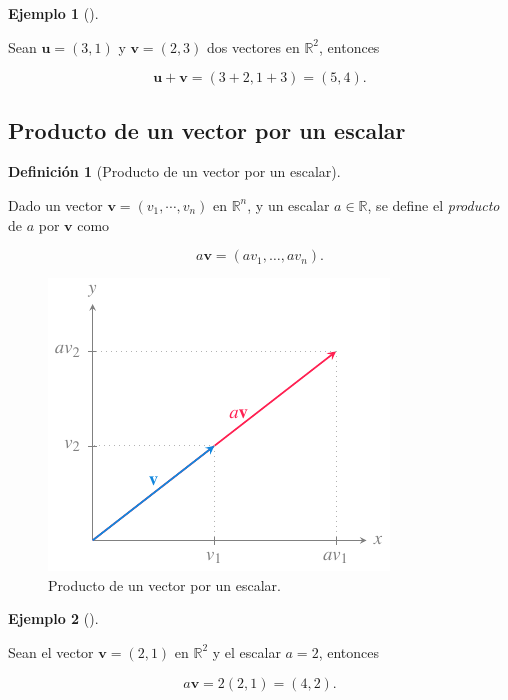 \documentclass[
  a4paper,
]{scrreport}
\theoremstyle{definition}
\newtheorem{example}{Ejemplo}[chapter]
\theoremstyle{plain}
\theoremstyle{definition}
\newtheorem{definition}{Definición}[chapter]
\theoremstyle{definition}
\theoremstyle{plain}
\theoremstyle{plain}
\theoremstyle{remark}
\begin{document}
\begin{example}[]\protect\hypertarget{exm-suma-vectores}{}\label{exm-suma-vectores}

Sean \(\mathbf{u}=(3,1)\) y \(\mathbf{v}=(2,3)\) dos vectores en
\(\mathbb{R}^2\), entonces

\[
\mathbf{u}+\mathbf{v} = (3+2,1+3) = (5,4).
\]

\end{example}

\subsection{Producto de un vector por un
escalar}\label{producto-de-un-vector-por-un-escalar}

\begin{definition}[Producto de un vector por un
escalar]\protect\hypertarget{def-producto-por-escalar}{}\label{def-producto-por-escalar}

Dado un vector \(\mathbf{v}=(v_1,\cdots,v_n)\) en \(\mathbb{R}^n\), y un
escalar \(a\in \mathbb{R}\), se define el \emph{producto} de \(a\) por
\(\mathbf{v}\) como

\[
a\mathbf{v} = (av_1,\ldots, av_n).
\]

\end{definition}

\begin{figure}[H]

{\centering \includegraphics{img/geometria-plano-espacio/producto-vector-por-escalar.pdf}

}

\caption{Producto de un vector por un escalar.}

\end{figure}%

\begin{example}[]\protect\hypertarget{exm-producto-por-escalar}{}\label{exm-producto-por-escalar}

Sean el vector \(\mathbf{v}=(2,1)\) en \(\mathbb{R}^2\) y el escalar
\(a=2\), entonces

\[
a\mathbf{v} = 2(2,1) = (4,2).
\]

\end{example}
\end{document}
